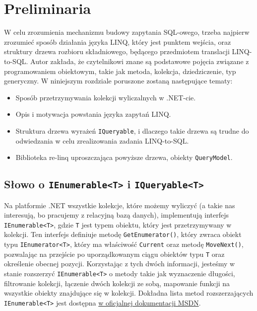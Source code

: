 \chapter{Preliminaria}
W celu zrozumienia mechanizmu budowy zapytania SQL-owego, trzeba najpierw zrozumieć sposób działania języka LINQ, który jest punktem wejścia, oraz struktury drzewa rozbioru składniowego, będącego przedmiotem translacji \linebreak LINQ-to-SQL. Autor zakłada, że czytelnikowi znane są podstawowe pojęcia związane z programowaniem obiektowym, takie jak metoda, kolekcja, dziedziczenie, typ generyczny. W niniejszym rozdziale poruszone zostaną następujące tematy:

\begin{itemize}
\item Sposób przetrzymywania kolekcji wyliczalnych w .NET-cie.
\item Opis i motywacja powstania języka zapytań LINQ.
\item Struktura drzewa wyrażeń \texttt{IQueryable}, i dlaczego takie drzewa są trudne do odwiedzania w celu zrealizowania zadania LINQ-to-SQL.
\item Biblioteka re-linq uproszczająca powyższe drzewa, obiekty \texttt{QueryModel}.
\end{itemize}

\section{Słowo o \texttt{IEnumerable<T>} i \texttt{IQueryable<T>}}
Na platformie .NET wszystkie kolekcje, które możemy wyliczyć (a takie nas interesują, bo pracujemy z relacyjną bazą danych), implementują interfejs \linebreak \texttt{IEnumerable<T>}, gdzie \texttt{T} jest typem obiektu, który jest przetrzymywany w kolekcji. Ten interfejs definiuje metodę \texttt{GetEnumerator()}, który zwraca obiekt typu \texttt{IEnumerator<T>}, który ma właściwość \texttt{Current} oraz metodę \texttt{MoveNext()}, pozwalając na przejście po uporządkowanym ciągu obiektów typu \texttt{T} oraz określenie obecnej pozycji. Korzystając z tych dwóch informacji, jesteśmy w stanie rozszerzyć \texttt{IEnumerable<T>} o metody takie jak wyznaczenie długości, filtrowanie kolekcji, łączenie dwóch kolekcji ze sobą, mapowanie funkcji na wszystkie obiekty znajdujące się w kolekcji. Dokładna lista metod rozszerzających \texttt{IEnumerable<T>} jest dostępna \href{https://msdn.microsoft.com/pl-pl/library/9eekhta0(v=vs.110).aspx}{w oficjalnej dokumentacji MSDN}. \pagebreak

